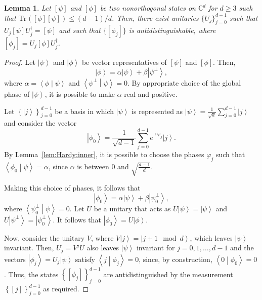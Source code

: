 \documentclass[DIV=calc,paper=a4,fontsize=11pt,twocolumn]{scrartcl} %
\theoremstyle{definition}
\theoremstyle{plain}
\newtheorem{lemma}[definition]{Lemma}
\newcommand{\Ket}[1]{\ensuremath{\left \vert #1 \right \rangle}}
\newcommand{\BraKet}[2]{\ensuremath{\left \langle #1 \middle \vert #2
\right \rangle}}
\newcommand{\Proj}[1]{\ensuremath{\left [ #1 \right ]}}
\newcommand{\Tr}[2][]{\ensuremath{\text{Tr}_{#1} \left ( #2 \right )}}
\begin{document}
\begin{lemma}
\label{lem:Hardy:qstates}
Let $\Proj{\psi}$ and $\Proj{\phi}$ be two nonorthogonal states on
$\mathbb{C}^d$ for $d \geq 3$ such that $\Tr{\Proj{\phi}\Proj{\psi}}
\leq (d-1)/d$.  Then, there exist unitaries $\{U_j\}_{j=0}^{d-1}$
such that $U_j \Proj{\psi} U_j^{\dagger} = \Proj{\psi}$ and such
that $\{\Proj{\phi_j}\}$ is antidistinguishable, where $
\Proj{\phi_j} = U_j \Proj{\phi} U_j^{\dagger}$.
\end{lemma}
\begin{proof}
Let $\Ket{\psi}$ and $\Ket{\phi}$ be vector representatives of
$\Proj{\psi}$ and $\Proj{\phi}$.  Then,
\begin{equation}
\Ket{\phi} = \alpha \Ket{\psi} + \beta \Ket{\psi^{\perp}},
\end{equation}
where $\alpha = \BraKet{\phi}{\psi}$ and
$\BraKet{\psi^{\perp}}{\psi} = 0$.  By appropriate choice of the
global phase of $\Ket{\psi}$, it is possible to make $\alpha$ real
and positive.

Let $\left \{ \Ket{j} \right \}_{j=0}^{d-1}$ be a basis in which
$\Ket{\psi}$ is represented as $\Ket{\psi} = \frac{1}{\sqrt{d}}
\sum_{j=0}^{d-1} \Ket{j}$ and consider the vector
\begin{equation}
\Ket{\phi_0} = \frac{1}{\sqrt{d-1}}\sum_{j=0}^{d-1} e^{\imath \varphi_j} \Ket{j}.
\end{equation}
By Lemma~\ref{lem:Hardy:inner}, it is possible to choose the phases
$\varphi_j$ such that $\BraKet{\phi_0}{\psi} = \alpha$, since
$\alpha$ is between $0$ and $\sqrt{\frac{d-1}{d}}$.

Making this choice of phases, it follows that
\begin{equation}
\Ket{\phi_0} = \alpha \Ket{\psi} + \beta \Ket{\psi^{\perp}_0},
\end{equation}
where $\BraKet{\psi^{\perp}_0}{\psi} = 0$.  Let $U$ be a unitary
that acts as $U \Ket{\psi} = \Ket{\psi}$ and $U \Ket{\psi^{\perp}} =
\Ket{\psi^{\perp}_0}$.  It follows that $\Ket{\phi_0} = U
\Ket{\phi}$.

Now, consider the unitary $V$, where $V\Ket{j} = \Ket{j + 1 \mod
d}$, which leaves $\Ket{\psi}$ invariant.  Then, $U_j = V^jU$ also
leaves $\Ket{\psi}$ invariant for $j = 0,1,\ldots,d-1$ and the
vectors $\Ket{\phi_j} = U_j\Ket{\psi}$ satisfy $\BraKet{j}{\phi_j} =
0$, since, by construction, $\BraKet{0}{\phi_0} = 0$.  Thus, the
states $\left \{ \Proj{\phi_j} \right \}_{j=0}^{d-1}$ are
antidistinguished by the measurement $\left \{\Proj{j} \right
\}_{j=0}^{d-1}$ as required.
\end{proof}
\end{document}

